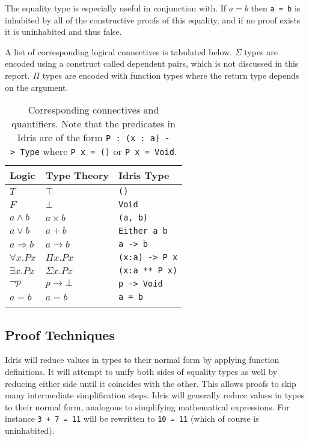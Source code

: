 \documentclass[11pt]{report}
\begin{document}
\begin{spacing}{1.15}
The equality type is especially useful in conjunction with. If $a=b$ then \texttt{a = b} is inhabited by all of the constructive proofs of this equality, and if no proof exists it is uninhabited and thus false.

A list of corresponding logical connectives is tabulated below.  $\Sigma$ types are encoded using a construct called dependent pairs, which is not discussed in this report. $\Pi$ types are encoded with function types where the return type depends on the argument.

\begin{longtable}[]{@{}lll@{}}
\toprule
Logic & Type Theory & Idris
Type \\
\midrule
\endhead
{\(T\)} & {\(\top\)} & \texttt{()} \\
{\(F\)} & {\(\bot\)} & \texttt{Void} \\
{\(a \land b\)} & {\(a \times b\)} & \texttt{(a,\ b)} \\
{\(a \vee b\)} & {\(a + b\)} & \texttt{Either\ a\ b} \\
{\(a\Rightarrow b\)} & {\(a \rightarrow b\)} &
\texttt{a\ -\textgreater{}\ b} \\
{\(\forall x.Px\)} & {\(\Pi x.Px\)} &
\texttt{(x:a)\ -\textgreater{}\ P\ x} \\
{\(\exists x.Px\)} & {\(\Sigma x.Px\)} & \texttt{(x:a\ **\ P\ x)} \\
{\(\neg p\)} & {\(p \rightarrow \bot\)} &
\texttt{p\ -\textgreater{}\ Void} \\
{$a=b$} & {$a=b$} & {\texttt{a = b}} \\
\bottomrule
\caption{Corresponding connectives and quantifiers. Note that the predicates in Idris are of the form \texttt{P\ :\ (x\ :\ a)\ -\textgreater{}\ Type} where \texttt{P\ x\ =\ ()} or \texttt{P\ x\ =\ Void}.}
\end{longtable}

\subsection{Proof Techniques}

Idris will reduce values in types to their normal form by applying function definitions. It will attempt to unify both sides of equality types as well by reducing either side until it coincides with the other. This allows proofs to skip many intermediate simplification steps. Idris will generally reduce values in types to their normal form, analogous to simplifying mathematical expressions. For instance \texttt{3 + 7 = 11} will be rewritten to \texttt{10 = 11} (which of course is uninhabited).


\end{spacing}
\end{document}
